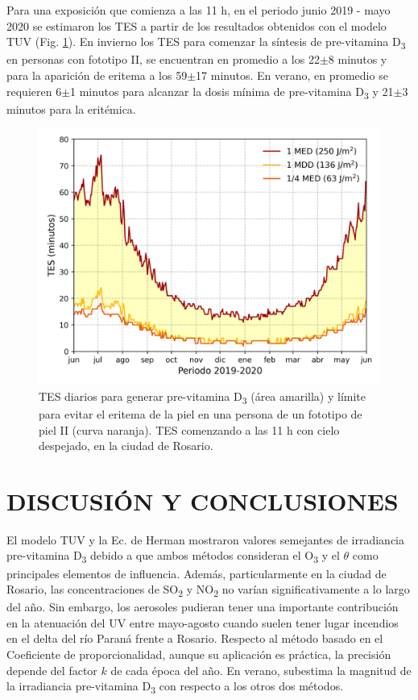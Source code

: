 \documentclass[10pt,twocolumn]{article}
\begin{document}
Para una exposición que comienza a las 11 h, en el periodo junio 2019 - mayo 2020 se estimaron los TES a partir de los resultados obtenidos con el modelo TUV (Fig. \ref{fig:TES}). En invierno los TES para comenzar la síntesis de pre-vitamina D\textsubscript{3} en personas con fototipo II, se encuentran en promedio a los 22$\pm$8 minutos y para la aparición de eritema a los 59$\pm$17 minutos. En verano, en promedio se requieren 6$\pm$1 minutos para alcanzar la dosis mínima de pre-vitamina D\textsubscript{3} y 21$\pm$3 minutos para la eritémica.

\begin{figure}[ht]
  \centering
  \includegraphics[scale=0.47]{dosis_vitamin.png}
  \caption{TES diarios para generar pre-vitamina D\textsubscript{3} (área amarilla) y límite para evitar el eritema de la piel en una persona de un fototipo de piel II (curva naranja). TES comenzando a las 11 h con cielo despejado, en la ciudad de Rosario.}
  \label{fig:TES}
\end{figure}

\section{DISCUSIÓN Y CONCLUSIONES}
El modelo TUV y la Ec. de Herman mostraron valores semejantes de irradiancia pre-vitamina D\textsubscript{3} debido a que ambos métodos consideran el O\textsubscript{3} y el $\theta$ como principales elementos de influencia. Además, particularmente en la ciudad de Rosario, las concentraciones de SO\textsubscript{2} y NO\textsubscript{2} no varían significativamente a lo largo del año. Sin embargo, los aerosoles pudieran tener una importante contribución en la atenuación del UV entre mayo-agosto cuando suelen tener lugar incendios en el delta del río Paraná frente a Rosario.\cite{Madronich1987} Respecto al método basado en el Coeficiente de proporcionalidad, aunque su aplicación es práctica, la precisión depende del factor $k$ de cada época del año. En verano, subestima la magnitud de la irradiancia pre-vitamina D\textsubscript{3} con respecto a los otros dos métodos.
\end{document}
